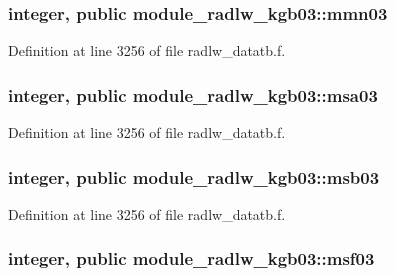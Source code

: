 \subsubsection[{\texorpdfstring{mmn03}{mmn03}}]{\setlength{\rightskip}{0pt plus 5cm}integer, public module\+\_\+radlw\+\_\+kgb03\+::mmn03}\hypertarget{namespacemodule__radlw__kgb03_ab4e84b10460930267256c0e5a1fe7a55}{}\label{namespacemodule__radlw__kgb03_ab4e84b10460930267256c0e5a1fe7a55}


Definition at line 3256 of file radlw\+\_\+datatb.\+f.

\subsubsection[{\texorpdfstring{msa03}{msa03}}]{\setlength{\rightskip}{0pt plus 5cm}integer, public module\+\_\+radlw\+\_\+kgb03\+::msa03}\hypertarget{namespacemodule__radlw__kgb03_a78658032153f7a4cbeaa198cbe661244}{}\label{namespacemodule__radlw__kgb03_a78658032153f7a4cbeaa198cbe661244}


Definition at line 3256 of file radlw\+\_\+datatb.\+f.

\subsubsection[{\texorpdfstring{msb03}{msb03}}]{\setlength{\rightskip}{0pt plus 5cm}integer, public module\+\_\+radlw\+\_\+kgb03\+::msb03}\hypertarget{namespacemodule__radlw__kgb03_ac57ba9584cbc3a5e4e2e0a6b548d21e9}{}\label{namespacemodule__radlw__kgb03_ac57ba9584cbc3a5e4e2e0a6b548d21e9}


Definition at line 3256 of file radlw\+\_\+datatb.\+f.

\subsubsection[{\texorpdfstring{msf03}{msf03}}]{\setlength{\rightskip}{0pt plus 5cm}integer, public module\+\_\+radlw\+\_\+kgb03\+::msf03}\hypertarget{namespacemodule__radlw__kgb03_af553bb46aa3ea6bcbb945cb2c2778955}{}\label{namespacemodule__radlw__kgb03_af553bb46aa3ea6bcbb945cb2c2778955}


